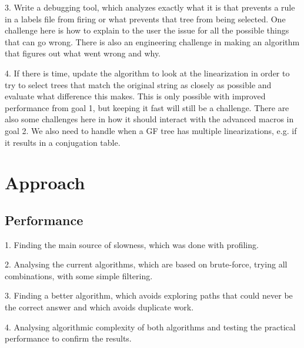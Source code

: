 \documentclass{article}
\begin{document}
3. Write a debugging tool, which analyzes exactly what it is that prevents a rule in a labels file from firing or what prevents that tree from being selected. 
One challenge here is how to explain to the user the issue for all the possible things that can go wrong. 
There is also an engineering challenge in making an algorithm that figures out what went wrong and why.

4. If there is time, update the algorithm to look at the linearization in order to try to select trees that match the original string as closely as possible and evaluate what difference this makes. This is only possible with improved performance from goal 1, but keeping it fast will still be a challenge. There are also some challenges here in how it should interact with the advanced macros in goal 2. We also need to handle when a GF tree has multiple linearizations, e.g. if it results in a conjugation table. 





\section{Approach}

\subsection{Performance}

1. Finding the main source of slowness, which was done with profiling.

2. Analysing the current algorithms, which are based on brute-force, trying all combinations, with some simple filtering.

3. Finding a better algorithm, which avoids exploring paths that could never be the correct answer and which avoids duplicate work.

4. Analysing algorithmic complexity of both algorithms and testing the practical performance to confirm the results.
\end{document}
